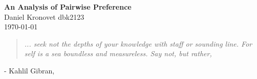 \begin{center}
  \Large \textbf{An Analysis of Pairwise Preference} \\
  \vspace{0.1in}
  \normalsize Daniel Kronovet dbk2123\\
  \today
\end{center}
  
\begin{center}  
\begin{quotation}
\textit{
	... seek not the depths of your knowledge with staff or sounding line.
	For self is a sea boundless and measureless.
	Say not,  but rather, 
	}
\end{quotation}
- Kahlil Gibran, \textit{} 
\end{center}